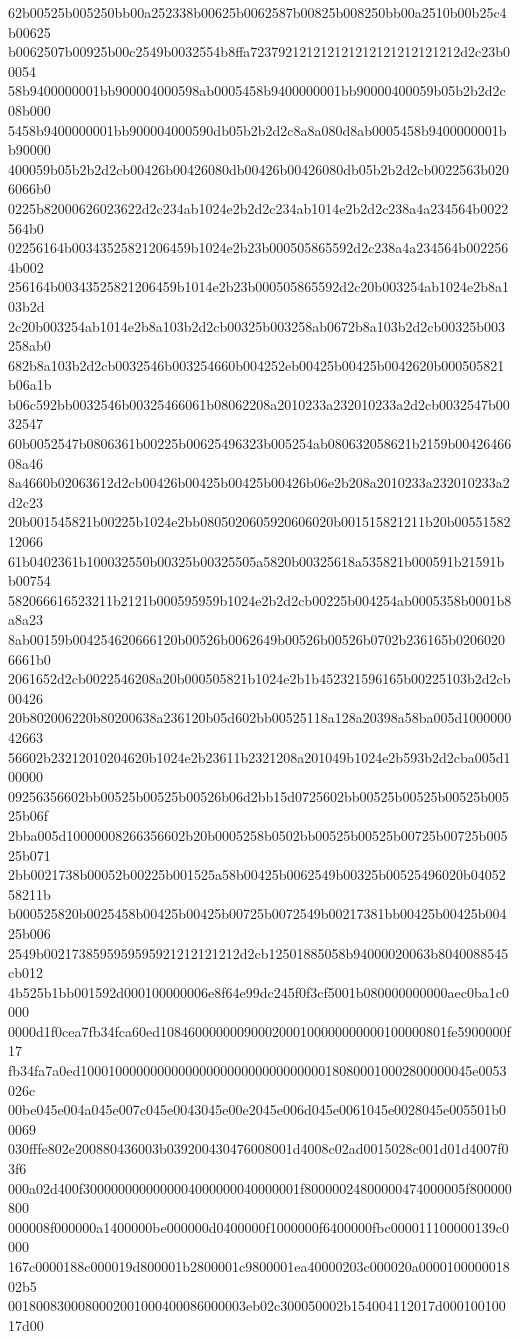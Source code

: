 62b00525b005250bb00a252338b00625b0062587b00825b008250bb00a2510b00b25c4b00625
b0062507b00925b00c2549b0032554b8ffa723792121212121212121212121212d2c23b00054
58b9400000001bb900004000598ab0005458b9400000001bb90000400059b05b2b2d2c08b000
5458b9400000001bb900004000590db05b2b2d2c8a8a080d8ab0005458b9400000001bb90000
400059b05b2b2d2cb00426b00426080db00426b00426080db05b2b2d2cb0022563b0206066b0
0225b82000626023622d2c234ab1024e2b2d2c234ab1014e2b2d2c238a4a234564b0022564b0
02256164b00343525821206459b1024e2b23b000505865592d2c238a4a234564b0022564b002
256164b00343525821206459b1014e2b23b000505865592d2c20b003254ab1024e2b8a103b2d
2c20b003254ab1014e2b8a103b2d2cb00325b003258ab0672b8a103b2d2cb00325b003258ab0
682b8a103b2d2cb0032546b003254660b004252eb00425b00425b0042620b000505821b06a1b
b06c592bb0032546b00325466061b08062208a2010233a232010233a2d2cb0032547b0032547
60b0052547b0806361b00225b00625496323b005254ab080632058621b2159b0042646608a46
8a4660b02063612d2cb00426b00425b00425b00426b06e2b208a2010233a232010233a2d2c23
20b001545821b00225b1024e2bb0805020605920606020b001515821211b20b0055158212066
61b0402361b100032550b00325b00325505a5820b00325618a535821b000591b21591bb00754
582066616523211b2121b000595959b1024e2b2d2cb00225b004254ab0005358b0001b8a8a23
8ab00159b004254620666120b00526b0062649b00526b00526b0702b236165b02060206661b0
2061652d2cb0022546208a20b000505821b1024e2b1b452321596165b00225103b2d2cb00426
20b802006220b80200638a236120b05d602bb00525118a128a20398a58ba005d100000042663
56602b23212010204620b1024e2b23611b2321208a201049b1024e2b593b2d2cba005d100000
09256356602bb00525b00525b00526b06d2bb15d0725602bb00525b00525b00525b00525b06f
2bba005d10000008266356602b20b0005258b0502bb00525b00525b00725b00725b00525b071
2bb0021738b00052b00225b001525a58b00425b0062549b00325b00525496020b0405258211b
b000525820b0025458b00425b00425b00725b0072549b00217381bb00425b00425b00425b006
2549b0021738595959595921212121212d2cb12501885058b94000020063b8040088545cb012
4b525b1bb001592d000100000006e8f64e99dc245f0f3cf5001b080000000000aec0ba1c0000
0000d1f0cea7fb34fca60ed10846000000090002000100000000000100000801fe5900000f17
fb34fa7a0ed10001000000000000000000000000000000180800010002800000045e0053026c
00be045e004a045e007c045e0043045e00e2045e006d045e0061045e0028045e005501b00069
030fffe802e200880436003b039200430476008001d4008c02ad0015028c001d01d4007f03f6
000a02d400f3000000000000004000000040000001f80000024800000474000005f800000800
000008f000000a1400000be000000d0400000f1000000f6400000fbc000011100000139c0000
167c0000188c000019d800001b2800001c9800001ea40000203c000020a000010000001802b5
0018008300080002001000400086000003eb02c300050002b154004112017d00010010017d00
